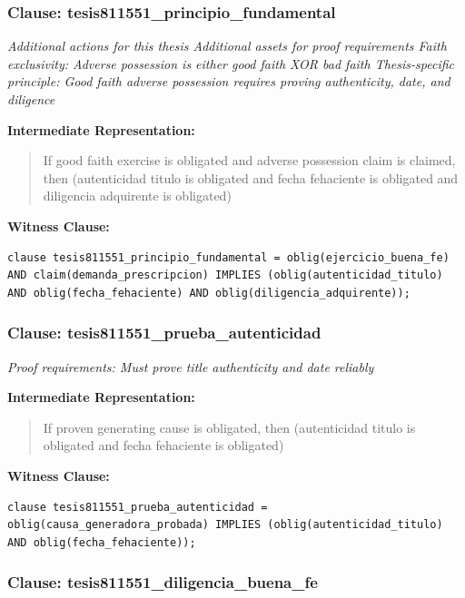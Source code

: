 \documentclass[11pt,a4paper]{article}
\begin{document}
\subsubsection{Clause: tesis811551\_principio\_fundamental}

\textit{Additional actions for this thesis Additional assets for proof requirements Faith exclusivity: Adverse possession is either good faith XOR bad faith Thesis-specific principle: Good faith adverse possession requires proving authenticity, date, and diligence}

\textbf{Intermediate Representation:}

\begin{quote}
If good faith exercise is obligated and adverse possession claim is claimed, then (autenticidad titulo is obligated and fecha fehaciente is obligated and diligencia adquirente is obligated)
\end{quote}

\textbf{Witness Clause:}

\begin{lstlisting}[style=witnessstyle, language=Witness]
clause tesis811551_principio_fundamental = oblig(ejercicio_buena_fe) AND claim(demanda_prescripcion) IMPLIES (oblig(autenticidad_titulo) AND oblig(fecha_fehaciente) AND oblig(diligencia_adquirente));
\end{lstlisting}

\subsubsection{Clause: tesis811551\_prueba\_autenticidad}

\textit{Proof requirements: Must prove title authenticity and date reliably}

\textbf{Intermediate Representation:}

\begin{quote}
If proven generating cause is obligated, then (autenticidad titulo is obligated and fecha fehaciente is obligated)
\end{quote}

\textbf{Witness Clause:}

\begin{lstlisting}[style=witnessstyle, language=Witness]
clause tesis811551_prueba_autenticidad = oblig(causa_generadora_probada) IMPLIES (oblig(autenticidad_titulo) AND oblig(fecha_fehaciente));
\end{lstlisting}

\subsubsection{Clause: tesis811551\_diligencia\_buena\_fe}
\end{document}
